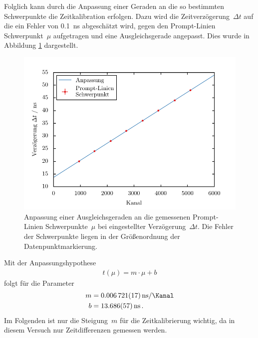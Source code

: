 \documentclass[11pt, a4paper]{article}
\numberwithin{equation}{section}
\begin{document}
Folglich kann durch die Anpassung einer Geraden an die so bestimmten Schwerpunkte die Zeitkalibration erfolgen.
Dazu wird die Zeitverzögerung~$\Delta t$ auf die ein Fehler von \SI{0.1}{ns} abgeschätzt wird, gegen den Prompt-Linien Schwerpunkt~$\mu$ aufgetragen und eine Ausgleichsgerade angepasst.
Dies wurde in Abbildung \ref{fig:prompt_anpassung} dargestellt.
\begin{figure}[h]
	\centering
	\includegraphics{./figures/prompt_curve.pdf}
	\caption{Anpassung einer Ausgleichsgeraden an die gemessenen Prompt-Linien Schwerpunkte~$\mu$ bei eingestellter Verzögerung~$\Delta t$. Die Fehler der Schwerpunkte liegen in der Größenordnung der Datenpunktmarkierung.}
	\label{fig:prompt_anpassung}
\end{figure}
Mit der Anpassungshypothese 
\begin{align*}
	t(\mu) = m \cdot \mu + b
\end{align*}
folgt für die Parameter
\begin{align*}
	m &= \SI{0.006721 +- 0.000017}{\nano\second\per\Kanal} \\
	b &= \SI{13.686 +- 0.057}{\nano\second} \, \text{.}
\end{align*}
Im Folgenden ist nur die Steigung~$m$ für die Zeitkalibrierung wichtig, da in diesem Versuch nur Zeitdifferenzen gemessen werden.
\end{document}
